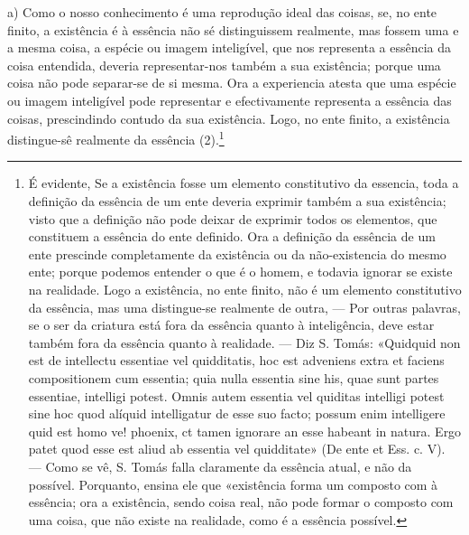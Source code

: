 \documentclass[12pt,a4paper]{article}
\newcommand{\pagmark}[1]{\quad[\textit{p.\,#1}]\quad}
\begin{document}
{{{{{{{{{{{{{{     \medskip\noindent a) Como o nosso conhecimento é uma reprodução ideal
das coisas, se, no ente finito, a existência é à essência não sé
distinguissem realmente, mas fossem uma e a mesma coisa, a
espécie ou imagem inteligível, que nos representa a essência da
coisa entendida, deveria representar-nos também a sua existência;
porque uma coisa não pode separar-se de si mesma. Ora a experiencia atesta que uma espécie ou imagem inteligível pode
representar e efectivamente representa a essência das coisas,
prescindindo contudo da sua existência. Logo, no ente finito, a
existência distingue-sê realmente da essência (2).\footnote{É evidente, Se a existência fosse um elemento constitutivo da essencia, toda a definição da essência de um ente deveria exprimir também a
sua existência; visto que a definição não pode deixar de exprimir todos os
elementos, que constituem a essência do ente definido. Ora a definição da
essência de um ente prescinde completamente da existência ou da não-existencia do mesmo ente; porque podemos entender o que é o homem, e todavia ignorar se existe na realidade. Logo a existência, no ente finito, não
é um elemento constitutivo da essência, mas uma distingue-se realmente de
outra, — Por outras palavras, se o ser da criatura está fora da essência
quanto à inteligência, deve estar também fora da essência quanto à realidade.
— Diz S. Tomás: «Quidquid non est de intellectu essentiae vel quidditatis, hoc est adveniens extra et faciens compositionem cum essentia; quia
\pagmark{316}
 nulla essentia sine his, quae sunt partes essentiae, intelligi potest. Omnis
 autem essentia vel quiditas intelligi potest sine hoc quod alíquid intelligatur
 de esse suo facto; possum enim intelligere quid est homo ve! phoenix, ct tamen
 ignorare an esse habeant in natura. Ergo patet quod esse est aliud ab essentia
 vel quidditate» (De ente et Ess. c. V). — Como se vê, S. Tomás falla
 claramente da essência atual, e não da possível. Porquanto, ensina ele
 que «existência forma um composto com à essência; ora a existência, sendo
 coisa real, não pode formar o composto com uma coisa, que não existe na
 realidade, como é a essência possível.}
\pagmark{316}

}}}}}}}}}}}}}}
\end{document}
